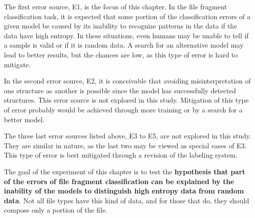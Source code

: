 The first error source, E1, is the focus of this chapter. In the file fragment classification task, it is expected that some portion of the classification errors of a given model be caused by its inability to recognize patterns in the data if the data have high entropy. In these situations, even humans may be unable to tell if a sample is valid or if it is random data. A search for an alternative model may lead to better results, but the chances are low, as this type of error is hard to mitigate. 

In the second error source, E2, it is conceivable that avoiding misinterpretation of one structure as another is possible since the model has successfully detected structures. This error source is not explored in this study. Mitigation of this type of error probably would be achieved through more training or by a search for a better model.

The three last error sources listed above, E3 to E5, are not explored in this study. They are similar in nature, as the last two may be viewed as special cases of E3. This type of error is best mitigated through a revision of the labeling system.


The goal of the experiment of this chapter is to test the \textbf{hypothesis that part of the errors of file fragment classification can be explained by the inability of the models to distinguish high entropy data from random data}. Not all file types have this kind of data, and for those that do, they should compose only a portion of the file.

